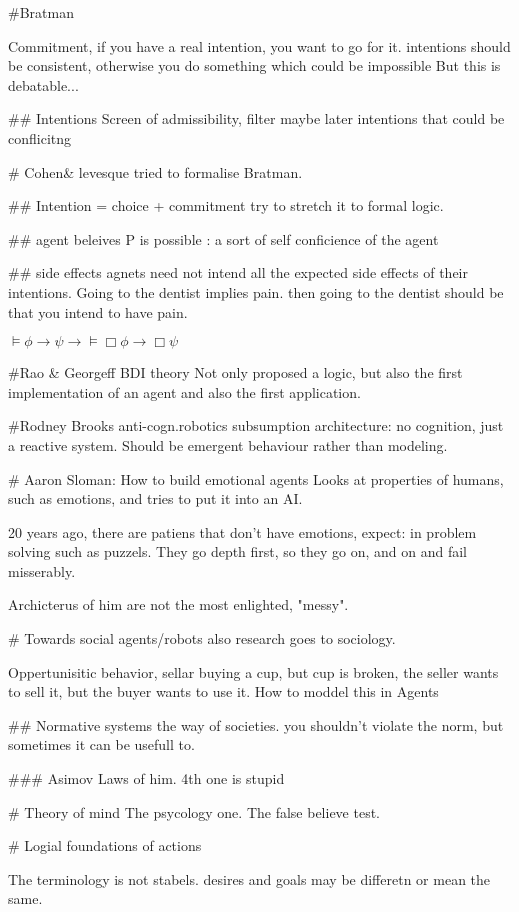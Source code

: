 #Bratman

Commitment, if you have a real intention, you want to go for it.
intentions should be consistent, otherwise you do something which could be
impossible
But this is debatable...


## Intentions
Screen of admissibility, filter maybe later intentions that could be
conflicitng


# Cohen& levesque
tried to formalise Bratman.

## Intention = choice + commitment
try to stretch it to formal logic.

##
agent beleives P is possible : a sort of self conficience of the agent

## side effects
agnets need not intend all the expected side effects of their intentions.
Going to the dentist implies pain.
then going to the dentist should be that you intend to have pain.

$\vDash \phi \to \psi \to \vDash \Box \phi \to \Box \psi$

#Rao & Georgeff BDI theory
Not only proposed a logic, but also the first implementation of an agent and
also the first application.

#Rodney Brooks anti-cogn.robotics
subsumption architecture: no cognition, just a reactive system.
Should be emergent behaviour rather than modeling.

# Aaron Sloman: How to build emotional agents
Looks at properties of humans, such as emotions, and tries to put it into an
AI.

20 years ago, there are patiens that don't have emotions, expect: in problem
solving such as puzzels. They go depth first, so they go on, and on and fail
misserably.

Archicterus of him are not the most enlighted, "messy".

# Towards social agents/robots
also research goes to sociology.

Oppertunisitic behavior, sellar buying a cup, but cup is broken,
the seller wants to sell it, but the buyer wants to use it. How
to moddel this in Agents

## Normative systems
the way of societies. you shouldn't violate the norm, but sometimes it can
be usefull to.

### Asimov
Laws of him. 4th one is stupid

# Theory of mind
The psycology one.
The false believe test.


# Logial foundations of actions

The terminology is not stabels.
desires and goals may be differetn or mean the same.


